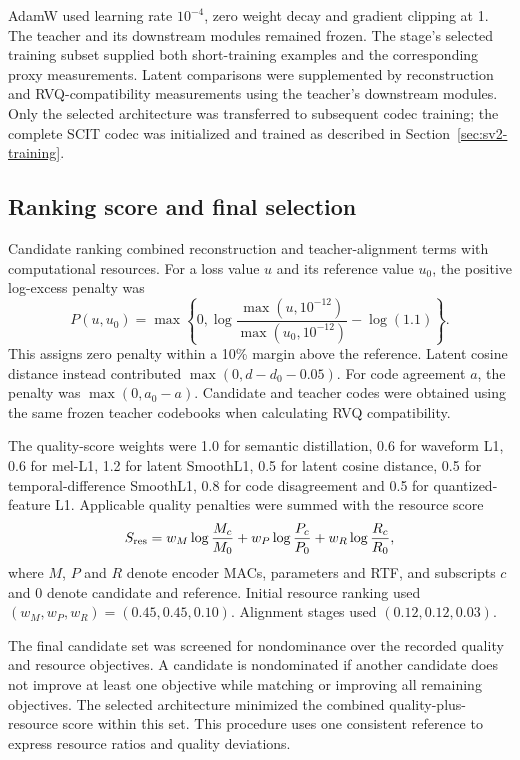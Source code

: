 AdamW used learning rate $10^{-4}$, zero weight decay and gradient clipping at 1. The teacher and its downstream modules remained frozen. The stage's selected training subset supplied both short-training examples and the corresponding proxy measurements. Latent comparisons were supplemented by reconstruction and RVQ-compatibility measurements using the teacher's downstream modules. Only the selected architecture was transferred to subsequent codec training; the complete SCIT codec was initialized and trained as described in Section~\ref{sec:sv2-training}.

\subsection{Ranking score and final selection}
Candidate ranking combined reconstruction and teacher-alignment terms with computational resources. For a loss value $u$ and its reference value $u_0$, the positive log-excess penalty was
\begin{equation}
 P(u,u_0)=\max\left\{0,
 \log\frac{\max(u,10^{-12})}{\max(u_0,10^{-12})}
 -\log(1.1)\right\}.
 \label{eq:sv2-penalty}
\end{equation}
This assigns zero penalty within a 10\% margin above the reference. Latent cosine distance instead contributed $\max(0,d-d_0-0.05)$. For code agreement $a$, the penalty was $\max(0,a_0-a)$. Candidate and teacher codes were obtained using the same frozen teacher codebooks when calculating RVQ compatibility.

The quality-score weights were 1.0 for semantic distillation, 0.6 for waveform L1, 0.6 for mel-L1, 1.2 for latent SmoothL1, 0.5 for latent cosine distance, 0.5 for temporal-difference SmoothL1, 0.8 for code disagreement and 0.5 for quantized-feature L1. Applicable quality penalties were summed with the resource score
\begin{equation}
 S_{\rm res}=
 w_M\log\frac{M_c}{M_0}
 +w_P\log\frac{P_c}{P_0}
 +w_R\log\frac{R_c}{R_0},
 \label{eq:sv2-resource}
\end{equation}
where $M$, $P$ and $R$ denote encoder MACs, parameters and RTF, and subscripts $c$ and 0 denote candidate and reference. Initial resource ranking used $(w_M,w_P,w_R)=(0.45,0.45,0.10)$. Alignment stages used $(0.12,0.12,0.03)$.

The final candidate set was screened for nondominance over the recorded quality and resource objectives. A candidate is nondominated if another candidate does not improve at least one objective while matching or improving all remaining objectives. The selected architecture minimized the combined quality-plus-resource score within this set. This procedure uses one consistent reference to express resource ratios and quality deviations.

